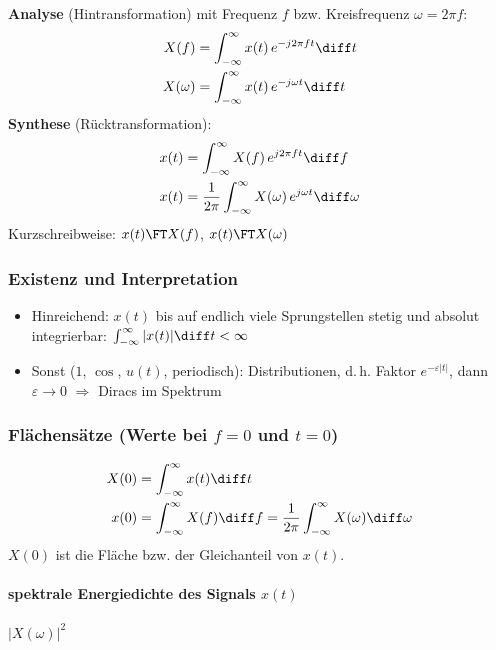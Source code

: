 \newcommand{\ftgroup}[1]{\multicolumn{3}{@{}l@{}}{\color{black!60}\textit{#1}}}
\newcommand{\fthead}{\textbf{$x(t)$} & \textbf{$X(f)$} & \textbf{$X(\omega)$} \\ \hline}


\begin{emphbox}
    \textbf{Analyse} (Hintransformation) mit Frequenz $f$ bzw. Kreisfrequenz $\omega=2\pi f$:
    \begin{align*}
        X(f)      & =\int_{-\infty}^{\infty}x(t)\,e^{-j2\pi ft}\diff t  \\
        X(\omega) & =\int_{-\infty}^{\infty}x(t)\,e^{-j\omega t}\diff t
    \end{align*}
    \textbf{Synthese} (Rücktransformation):
    \begin{align*}
        x(t) & =\int_{-\infty}^{\infty}X(f)\,e^{j2\pi ft}\diff f                         \\
        x(t) & =\frac{1}{2\pi}\int_{-\infty}^{\infty}X(\omega)\,e^{j\omega t}\diff\omega
    \end{align*}
    Kurzschreibweise: $x(t)\FT X(f)$, \quad $x(t)\FT X(\omega)$
\end{emphbox}

\begin{sectionbox}
    \subsubsection{Existenz und Interpretation}
    \begin{itemize}
        \item Hinreichend: $x(t)$ bis auf endlich viele Sprungstellen stetig und absolut integrierbar: $\int_{-\infty}^{\infty}|x(t)|\diff t<\infty$
        \item Sonst ($1$, $\cos$, $u(t)$, periodisch): Distributionen, d.\,h. Faktor $e^{-\varepsilon|t|}$, dann $\varepsilon\to0$ $\Rightarrow$ Diracs im Spektrum
    \end{itemize}
\end{sectionbox}

\begin{sectionbox}
    \subsubsection{Flächensätze (Werte bei $f=0$ und $t=0$)}
    \begin{align*}
        X(0) & =\int_{-\infty}^{\infty}x(t)\diff t                                                           \\
        x(0) & =\int_{-\infty}^{\infty}X(f)\diff f=\frac{1}{2\pi}\int_{-\infty}^{\infty}X(\omega)\diff\omega
    \end{align*}
    $X(0)$ ist die Fläche bzw. der Gleichanteil von $x(t)$.
    \paragraph{spektrale Energiedichte des Signals $x(t)$} $|X(\omega)|^2$
\end{sectionbox}

